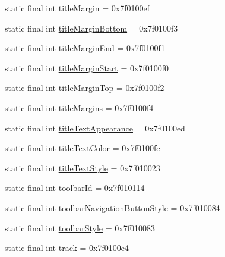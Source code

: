 \begin{CompactItemize}
\item 
static final int \hyperlink{classandroid_1_1support_1_1v7_1_1mediarouter_1_1_r_1_1attr_e4e8d6b01d2425ff1ad9bf16ba9ff27a}{titleMargin} = 0x7f0100ef
\item 
static final int \hyperlink{classandroid_1_1support_1_1v7_1_1mediarouter_1_1_r_1_1attr_5d135919c7ebb9d5f09d14e107ca33f5}{titleMarginBottom} = 0x7f0100f3
\item 
static final int \hyperlink{classandroid_1_1support_1_1v7_1_1mediarouter_1_1_r_1_1attr_a391800f934d77b9adaae672c16146d5}{titleMarginEnd} = 0x7f0100f1
\item 
static final int \hyperlink{classandroid_1_1support_1_1v7_1_1mediarouter_1_1_r_1_1attr_f10d68ba978bb1d9b9c021cb59b4cc57}{titleMarginStart} = 0x7f0100f0
\item 
static final int \hyperlink{classandroid_1_1support_1_1v7_1_1mediarouter_1_1_r_1_1attr_9ab52bdfb9235e372ad45e9d88aa2d93}{titleMarginTop} = 0x7f0100f2
\item 
static final int \hyperlink{classandroid_1_1support_1_1v7_1_1mediarouter_1_1_r_1_1attr_526e2fae3aaf66fbba6471ae26f95a89}{titleMargins} = 0x7f0100f4
\item 
static final int \hyperlink{classandroid_1_1support_1_1v7_1_1mediarouter_1_1_r_1_1attr_22b5bdaf6e9910f8cbe61d068b2c3ed6}{titleTextAppearance} = 0x7f0100ed
\item 
static final int \hyperlink{classandroid_1_1support_1_1v7_1_1mediarouter_1_1_r_1_1attr_a6c2b773de5d91f54bb8a21638066678}{titleTextColor} = 0x7f0100fc
\item 
static final int \hyperlink{classandroid_1_1support_1_1v7_1_1mediarouter_1_1_r_1_1attr_922327317bb2a26ef53821ffd0822f46}{titleTextStyle} = 0x7f010023
\item 
static final int \hyperlink{classandroid_1_1support_1_1v7_1_1mediarouter_1_1_r_1_1attr_4b3d4f669f18c5980bb14f853b4b66cf}{toolbarId} = 0x7f010114
\item 
static final int \hyperlink{classandroid_1_1support_1_1v7_1_1mediarouter_1_1_r_1_1attr_d5b86358eb76c96e6af0d921ec62c9b1}{toolbarNavigationButtonStyle} = 0x7f010084
\item 
static final int \hyperlink{classandroid_1_1support_1_1v7_1_1mediarouter_1_1_r_1_1attr_af484d1ecdcb0597073563e783c15f97}{toolbarStyle} = 0x7f010083
\item 
static final int \hyperlink{classandroid_1_1support_1_1v7_1_1mediarouter_1_1_r_1_1attr_d25a8d80921fda1c9538f55303bd7baa}{track} = 0x7f0100e4
\item 

\end{CompactItemize}
